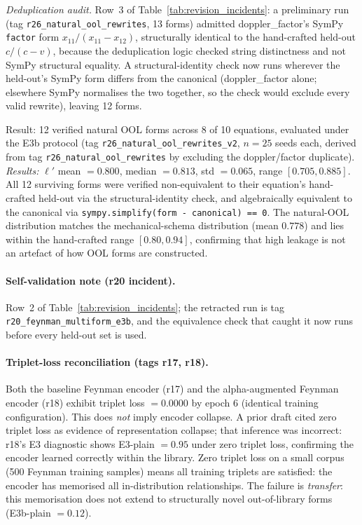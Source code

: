 \emph{Deduplication audit.} Row~3 of Table~\ref{tab:revision_incidents}: a preliminary run (tag \texttt{r26\_natural\_ool\_rewrites}, 13 forms) admitted doppler\_factor's SymPy \texttt{factor} form $x_{11}/(x_{11}-x_{12})$, structurally identical to the hand-crafted held-out $c/(c-v)$, because the deduplication logic checked string distinctness and not SymPy structural equality. A structural-identity check now runs wherever the held-out's SymPy form differs from the canonical (doppler\_factor alone; elsewhere SymPy normalises the two together, so the check would exclude every valid rewrite), leaving 12 forms.

Result: 12 verified natural OOL forms across 8 of 10 equations, evaluated under the E3b protocol (tag \texttt{r26\_natural\_ool\_rewrites\_v2}, $n{=}25$ seeds each, derived from tag \texttt{r26\_natural\_ool\_rewrites} by excluding the doppler/factor duplicate).  \emph{Results:} $\ell'$ mean $= 0.800$, median $= 0.813$, std $= 0.065$, range $[0.705, 0.885]$.  All 12 surviving forms were verified non-equivalent to their equation's hand-crafted held-out via the structural-identity check, and algebraically equivalent to the canonical via \texttt{sympy.simplify(form - canonical) == 0}.  The natural-OOL distribution matches the mechanical-schema distribution (mean $0.778$) and lies within the hand-crafted range $[0.80, 0.94]$, confirming that high leakage is not an artefact of how OOL forms are constructed.

\paragraph{Self-validation note (r20 incident).} Row~2 of Table~\ref{tab:revision_incidents}; the retracted run is tag \texttt{r20\_feynman\_multiform\_e3b}, and the equivalence check that caught it now runs before every held-out set is used.

\paragraph{Triplet-loss reconciliation (tags r17, r18).} Both the baseline Feynman encoder (r17) and the alpha-augmented Feynman encoder (r18) exhibit triplet loss $= 0.0000$ by epoch 6 (identical training configuration). This does \emph{not} imply encoder collapse. A prior draft cited zero triplet loss as evidence of representation collapse; that inference was incorrect: r18's E3 diagnostic shows E3-plain $= 0.95$ under zero triplet loss, confirming the encoder learned correctly within the library. Zero triplet loss on a small corpus (500 Feynman training samples) means all training triplets are satisfied: the encoder has memorised all in-distribution relationships. The failure is \emph{transfer}: this memorisation does not extend to structurally novel out-of-library forms (E3b-plain $= 0.12$).

